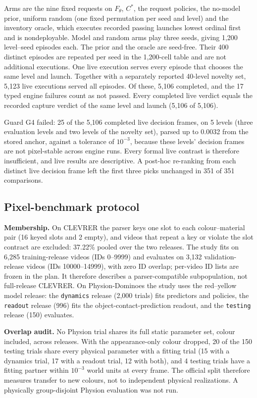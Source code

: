 \begin{revblock}
Arms are the nine fixed requests on $F_\theta$, $C^*$, the request policies, the no-model prior, uniform random (one fixed permutation per seed and level) and the inventory oracle, which executes recorded passing launches lowest ordinal first and is nondeployable. Model and random arms play three seeds, giving 1,200 level--seed episodes each. The prior and the oracle are seed-free. Their 400 distinct episodes are repeated per seed in the 1,200-cell table and are not additional executions. One live execution serves every episode that chooses the same level and launch. Together with a separately reported 40-level novelty set, 5,123 live executions served all episodes. Of these, 5,106 completed, and the 17 typed engine failures count as not passed. Every completed live verdict equals the recorded capture verdict of the same level and launch (5,106 of 5,106).

Guard G4 failed: 25 of the 5,106 completed live decision frames, on 5 levels (three evaluation levels and two levels of the novelty set), parsed up to 0.0032 from the stored anchor, against a tolerance of $10^{-3}$, because these levels' decision frames are not pixel-stable across engine runs. Every formal live contrast is therefore insufficient, and live results are descriptive. A post-hoc re-ranking from each distinct live decision frame left the first three picks unchanged in 351 of 351 comparisons.

\subsection{Pixel-benchmark protocol}
\label{sec:app:proto:pixel}

\textbf{Membership.} On CLEVRER the parser keys one slot to each colour--material pair (16 keyed slots and 2 empty), and videos that repeat a key or violate the slot contract are excluded: 37.22\% pooled over the two releases. The study fits on 6,285 training-release videos (IDs 0--9999) and evaluates on 3,132 validation-release videos (IDs 10000--14999), with zero ID overlap; per-video ID lists are frozen in the plan. It therefore describes a parser-compatible subpopulation, not full-release CLEVRER. On Physion-Dominoes the study uses the red--yellow model release: the \texttt{dynamics} release (2,000 trials) fits predictors and policies, the \texttt{readout} release (996) fits the object-contact-prediction readout, and the \texttt{testing} release (150) evaluates.

\textbf{Overlap audit.} No Physion trial shares its full static parameter set, colour included, across releases. With the appearance-only colour dropped, 20 of the 150 testing trials share every physical parameter with a fitting trial (15 with a dynamics trial, 17 with a readout trial, 12 with both), and 4 testing trials have a fitting partner within $10^{-3}$ world units at every frame. The official split therefore measures transfer to new colours, not to independent physical realizations. A physically group-disjoint Physion evaluation was not run.


\end{revblock}
